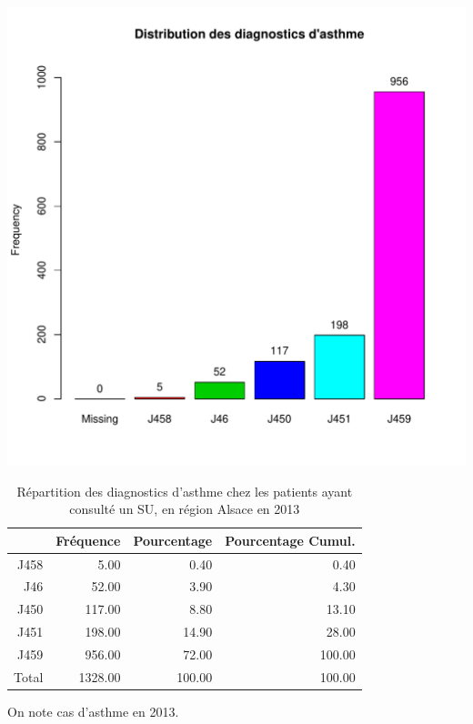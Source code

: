\documentclass[12pt,english,french,twoside]{report}\usepackage[]{graphicx}\usepackage[]{color}
\makeatletter
\def\maxwidth{ %
  \ifdim\Gin@nat@width>\linewidth
    \linewidth
  \else
    \Gin@nat@width
  \fi
}
\makeatother
\begin{document}
\includegraphics[width=\maxwidth]{figure/asthme} 
\begin{table}[ht]
\centering
\begin{tabular}{rrrr}
  \hline
 & Fréquence & Pourcentage & Pourcentage Cumul. \\ 
  \hline
J458 & 5.00 & 0.40 & 0.40 \\ 
  J46 & 52.00 & 3.90 & 4.30 \\ 
  J450 & 117.00 & 8.80 & 13.10 \\ 
  J451 & 198.00 & 14.90 & 28.00 \\ 
  J459 & 956.00 & 72.00 & 100.00 \\ 
    Total & 1328.00 & 100.00 & 100.00 \\ 
   \hline
\end{tabular}
\caption[Répartition des diagnostics d'asthme]{Répartition des diagnostics d'asthme chez les patients ayant consulté un  SU, en région Alsace en 2013} 
\label{tab:asthme}
\end{table}



On note  cas d'asthme en 2013.
\end{document}
